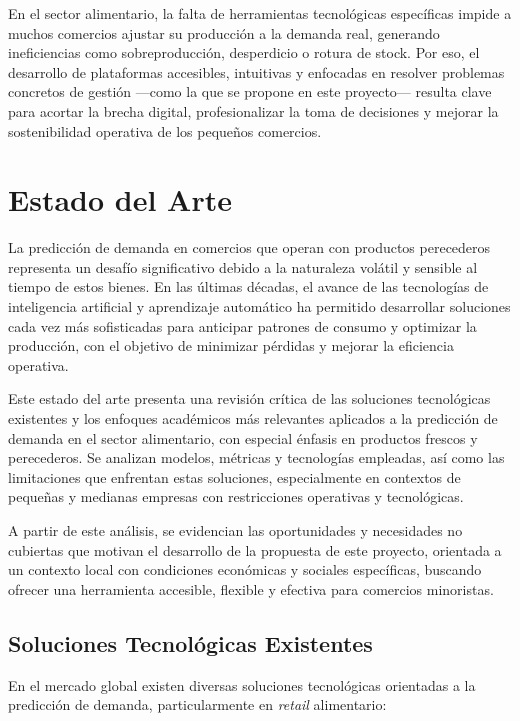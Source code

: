 En el sector alimentario, la falta de herramientas tecnológicas específicas impide a muchos comercios ajustar su producción a la demanda real, generando ineficiencias como sobreproducción, desperdicio o rotura de stock. Por eso, el desarrollo de plataformas accesibles, intuitivas y enfocadas en resolver problemas concretos de gestión —como la que se propone en este proyecto— resulta clave para acortar la brecha digital, profesionalizar la toma de decisiones y mejorar la sostenibilidad operativa de los pequeños comercios.

\chapter{Estado del Arte}\label{chapter03}

La predicción de demanda en comercios que operan con productos perecederos representa un desafío significativo debido a la naturaleza volátil y sensible al tiempo de estos bienes. En las últimas décadas, el avance de las tecnologías de inteligencia artificial y aprendizaje automático ha permitido desarrollar soluciones cada vez más sofisticadas para anticipar patrones de consumo y optimizar la producción, con el objetivo de minimizar pérdidas y mejorar la eficiencia operativa.

Este estado del arte presenta una revisión crítica de las soluciones tecnológicas existentes y los enfoques académicos más relevantes aplicados a la predicción de demanda en el sector alimentario, con especial énfasis en productos frescos y perecederos. Se analizan modelos, métricas y tecnologías empleadas, así como las limitaciones que enfrentan estas soluciones, especialmente en contextos de pequeñas y medianas empresas con restricciones operativas y tecnológicas.

A partir de este análisis, se evidencian las oportunidades y necesidades no cubiertas que motivan el desarrollo de la propuesta de este proyecto, orientada a un contexto local con condiciones económicas y sociales específicas, buscando ofrecer una herramienta accesible, flexible y efectiva para comercios minoristas.

\section{Soluciones Tecnológicas Existentes}

En el mercado global existen diversas soluciones tecnológicas orientadas a la predicción de demanda, particularmente en \textit{retail} alimentario:

